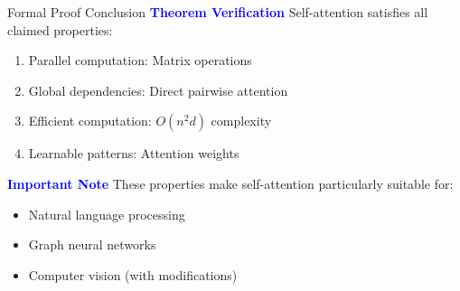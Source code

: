 \documentclass[serif, aspectratio=169]{beamer}
\begin{document}
\begin{frame}{Formal Proof Conclusion}
    \textcolor{blue}{\textbf{Theorem Verification}}
    \newline
        Self-attention satisfies all claimed properties:
        \begin{enumerate}
            \item Parallel computation: Matrix operations
            \item Global dependencies: Direct pairwise attention
            \item Efficient computation: $O(n^2d)$ complexity
            \item Learnable patterns: Attention weights
        \end{enumerate}
    \textcolor{blue}{\textbf{Important Note}}
    \newline
        These properties make self-attention particularly suitable for:
        \begin{itemize}
            \item Natural language processing
            \item Graph neural networks
            \item Computer vision (with modifications)
        \end{itemize}
\end{frame}
\end{document}
